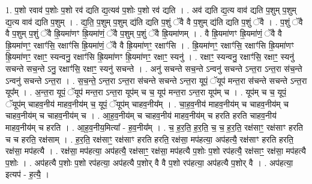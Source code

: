 \documentclass[17pt]{extarticle}
\begin{document}
1. प॒शो रवाव॑ प॒शोः प॒शो रव॑ द्यति द्य॒त्यव॑ प॒शोः प॒शो रव॑ द्यति । . अव॑ द्यति द्य॒त्य वाव॑ द्यति प॒शुम् प॒शुम् द्य॒त्य वाव॑ द्यति प॒शुम् । . द्य॒ति॒ प॒शुम् प॒शुम् द्य॑ति द्यति प॒शुं ॅवै वै प॒शुम् द्य॑ति द्यति प॒शुं ॅवै । . प॒शुं ॅवै वै प॒शुम् प॒शुं ॅवै ह्रि॒यमा॑णꣳ ह्रि॒यमा॑णं॒ ॅवै प॒शुम् प॒शुं ॅवै ह्रि॒यमा॑णम् । . वै ह्रि॒यमा॑णꣳ ह्रि॒यमा॑णं॒ ॅवै वै ह्रि॒यमा॑णꣳ॒॒ रक्षाꣳ॑सि॒ रक्षाꣳ॑सि ह्रि॒यमा॑णं॒ ॅवै वै ह्रि॒यमा॑णꣳ॒॒ रक्षाꣳ॑सि । . ह्रि॒यमा॑णꣳ॒॒ रक्षाꣳ॑सि॒ रक्षाꣳ॑सि ह्रि॒यमा॑णꣳ ह्रि॒यमा॑णꣳ॒॒ रक्षाꣳ॒॒ स्यन्वनु॒ रक्षाꣳ॑सि ह्रि॒यमा॑णꣳ ह्रि॒यमा॑णꣳ॒॒ रक्षाꣳ॒॒ स्यनु॑ । . रक्षाꣳ॒॒ स्यन्वनु॒ रक्षाꣳ॑सि॒ रक्षाꣳ॒॒ स्यनु॑ सचन्ते सच॒न्ते ऽनु॒ रक्षाꣳ॑सि॒ रक्षाꣳ॒॒ स्यनु॑ सचन्ते । . अनु॑ सचन्ते सच॒न्ते ऽन्वनु॑ सचन्ते ऽन्त॒रा ऽन्त॒रा स॑च॒न्ते ऽन्वनु॑ सचन्ते ऽन्त॒रा । . स॒च॒न्ते॒ ऽन्त॒रा ऽन्त॒रा स॑चन्ते सचन्ते ऽन्त॒रा यूपं॒ ॅयूप॑ मन्त॒रा स॑चन्ते सचन्ते ऽन्त॒रा यूप᳚म् । . अ॒न्त॒रा यूपं॒ ॅयूप॑ मन्त॒रा ऽन्त॒रा यूप॑म् च च॒ यूप॑ मन्त॒रा ऽन्त॒रा यूप॑म् च । . यूप॑म् च च॒ यूपं॒ ॅयूप॑म् चाहव॒नीय॑ माहव॒नीय॑म् च॒ यूपं॒ ॅयूप॑म् चाहव॒नीय᳚म् । . चा॒ह॒व॒नीय॑ माहव॒नीय॑म् च चाहव॒नीय॑म् च चाहव॒नीय॑म् च चाहव॒नीय॑म् च । . आ॒ह॒व॒नीय॑म् च चाहव॒नीय॑ माहव॒नीय॑म् च हरति हरति चाहव॒नीय॑ माहव॒नीय॑म् च हरति । . आ॒ह॒व॒नीय॒मित्या᳚ - ह॒व॒नीय᳚म् । . च॒ ह॒र॒ति॒ ह॒र॒ति॒ च॒ च॒ ह॒र॒ति॒ रक्ष॑साꣳ॒॒ रक्ष॑साꣳ हरति च च हरति॒ रक्ष॑साम् । . ह॒र॒ति॒ रक्ष॑साꣳ॒॒ रक्ष॑साꣳ हरति हरति॒ रक्ष॑सा॒ मप॑हत्या॒ अप॑हत्यै॒ रक्ष॑साꣳ हरति हरति॒ रक्ष॑सा॒ मप॑हत्यै । . रक्ष॑सा॒ मप॑हत्या॒ अप॑हत्यै॒ रक्ष॑साꣳ॒॒ रक्ष॑सा॒ मप॑हत्यै प॒शोः प॒शो रप॑हत्यै॒ रक्ष॑साꣳ॒॒ रक्ष॑सा॒ मप॑हत्यै प॒शोः । . अप॑हत्यै प॒शोः प॒शो रप॑हत्या॒ अप॑हत्यै प॒शोर् वै वै प॒शो रप॑हत्या॒ अप॑हत्यै प॒शोर् वै । . अप॑हत्या॒ इत्यप॑ - ह॒त्यै॒ । \newline
\end{document}
